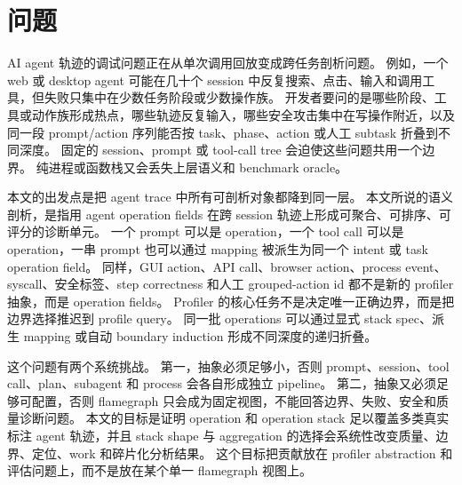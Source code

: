 \documentclass[10pt,twocolumn]{ctexart}
\begin{document}
\begin{abstract}
因此本文支持的是有范围限定的 profiling 主张。
operation-stack profiling 能在公开真实标注 trace 的 dataset-provided hidden labels 下定位、排序和解释任务相关 failure、quality problem 和 dataset-provided semantic boundary，并相对 flat summary 减少 inspection work、相对 fixed-session drilldown proxy 改善 median fragmentation tradeoff。
本文不声称提升 human productivity，不声称自动发现所有 intent boundary，不声称 free-form prompt/LLM tagger 已完成同输入准确率验证，不声称 metric dominance，也不声称完整兼容现有 trace ecosystem。
\end{abstract}

\section{问题}

AI agent 轨迹的调试问题正在从单次调用回放变成跨任务剖析问题。
例如，一个 web 或 desktop agent 可能在几十个 session 中反复搜索、点击、输入和调用工具，但失败只集中在少数任务阶段或少数操作族。
开发者要问的是哪些阶段、工具或动作族形成热点，哪些轨迹反复输入，哪些安全攻击集中在写操作附近，以及同一段 prompt/action 序列能否按 task、phase、action 或人工 subtask 折叠到不同深度。
固定的 session、prompt 或 tool-call tree 会迫使这些问题共用一个边界。
纯进程或函数栈又会丢失上层语义和 benchmark oracle。

本文的出发点是把 agent trace 中所有可剖析对象都降到同一层。
本文所说的语义剖析，是指用 agent operation fields 在跨 session 轨迹上形成可聚合、可排序、可评分的诊断单元。
一个 prompt 可以是 operation，一个 tool call 可以是 operation，一串 prompt 也可以通过 mapping 被派生为同一个 intent 或 task operation field。
同样，GUI action、API call、browser action、process event、syscall、安全标签、step correctness 和人工 grouped-action id 都不是新的 profiler 抽象，而是 operation fields。
Profiler 的核心任务不是决定唯一正确边界，而是把边界选择推迟到 profile query。
同一批 operations 可以通过显式 stack spec、派生 mapping 或自动 boundary induction 形成不同深度的递归折叠。

这个问题有两个系统挑战。
第一，抽象必须足够小，否则 prompt、session、tool call、plan、subagent 和 process 会各自形成独立 pipeline。
第二，抽象又必须足够可配置，否则 flamegraph 只会成为固定视图，不能回答边界、失败、安全和质量诊断问题。
本文的目标是证明 operation 和 operation stack 足以覆盖多类真实标注 agent 轨迹，并且 stack shape 与 aggregation 的选择会系统性改变质量、边界、定位、work 和碎片化分析结果。
这个目标把贡献放在 profiler abstraction 和评估问题上，而不是放在某个单一 flamegraph 视图上。
\end{document}
